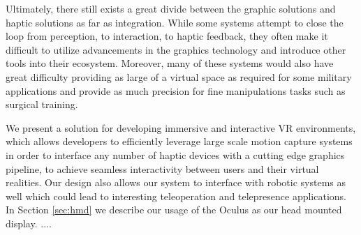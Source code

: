 Ultimately, there still exists a great divide between the graphic solutions and
haptic solutions as far as integration. While some systems attempt to close the
loop from perception, to interaction, to haptic feedback, they often make it
difficult to utilize advancements in the graphics technology and introduce
other tools into their ecosystem.  Moreover, many of these systems would also
have great difficulty providing as large of a virtual space as required for
some military applications and provide as much precision for fine manipulations
tasks such as surgical training.

We present a solution for developing immersive and interactive VR environments,
which allows developers to efficiently leverage large scale motion capture
systems in order to interface any number of haptic devices with a cutting edge
graphics pipeline, to achieve seamless interactivity between users and their
virtual realities. Our design also allows our system to interface with robotic
systems as well which could lead to interesting teleoperation and telepresence
applications. In Section \ref{sec:hmd} we describe our usage of the Oculus as
our head mounted display. ....
